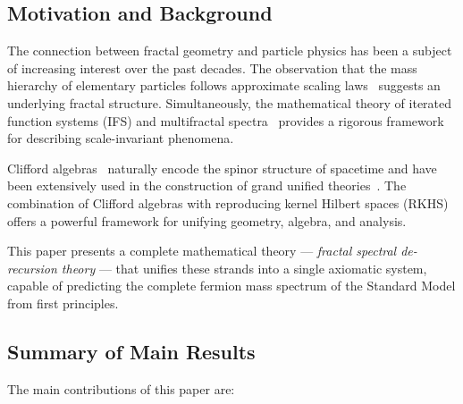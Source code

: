 \documentclass[12pt,a4paper]{article}
\begin{document}
\subsection{Motivation and Background}

The connection between fractal geometry and particle physics has been a subject of 
increasing interest over the past decades. The observation that the mass hierarchy 
of elementary particles follows approximate scaling laws~\cite{sm-mass} suggests 
an underlying fractal structure. Simultaneously, the mathematical theory of iterated 
function systems (IFS) and multifractal spectra~\cite{hutchinson,henson} provides 
a rigorous framework for describing scale-invariant phenomena.

Clifford algebras~\cite{clifford} naturally encode the spinor structure of spacetime 
and have been extensively used in the construction of grand unified theories~\cite{pati-salam}. 
The combination of Clifford algebras with reproducing kernel Hilbert spaces (RKHS)~\cite{aronszajn} 
offers a powerful framework for unifying geometry, algebra, and analysis.

This paper presents a complete mathematical theory --- \emph{fractal spectral de-recursion 
theory} --- that unifies these strands into a single axiomatic system, capable of 
predicting the complete fermion mass spectrum of the Standard Model from first principles.

\subsection{Summary of Main Results}

The main contributions of this paper are:
\end{document}
